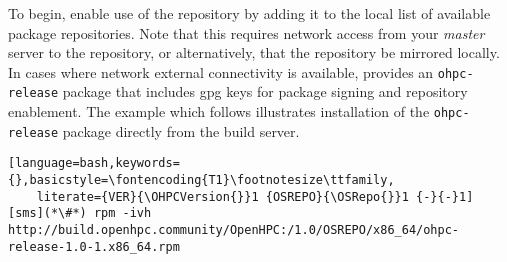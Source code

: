 To begin, enable use of the \OHPC{} repository by adding it to the local list
of available package repositories. Note that this requires network access from
your {\em master} server to the \OHPC{} repository, or alternatively, that
the \OHPC{} repository be mirrored locally.  In cases where network external
connectivity is available, \OHPC{} provides an \texttt{ohpc-release} package
that includes gpg keys for package signing and repository enablement.  The
example which follows illustrates installation of the \texttt{ohpc-release}
package directly from the \OHPC{} build server.


\begin{lstlisting}[language=bash,keywords={},basicstyle=\fontencoding{T1}\footnotesize\ttfamily,
	literate={VER}{\OHPCVersion{}}1 {OSREPO}{\OSRepo{}}1 {-}{-}1]
[sms](*\#*) rpm -ivh http://build.openhpc.community/OpenHPC:/1.0/OSREPO/x86_64/ohpc-release-1.0-1.x86_64.rpm
\end{lstlisting}







